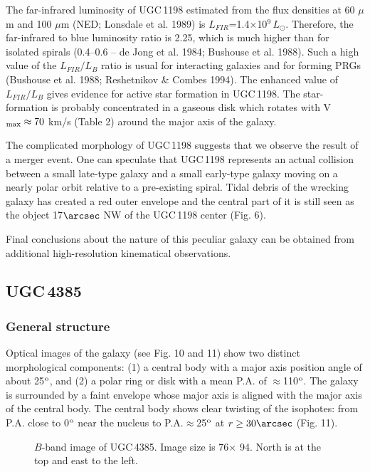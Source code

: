\documentclass[]{aa}
\begin{document}
The far-infrared luminosity of UGC\,1198 estimated from the
flux densities at 60 $\mu$m and 100 $\mu$m (NED; Lonsdale et al. 
1989) is $L_{FIR}$=1.4$\times$10$^9$\,$L_{\odot}$. Therefore,
the far-infrared to blue luminosity ratio is 2.25, which is
much higher than for isolated spirals (0.4--0.6 -- de Jong et al. 1984;
Bushouse et al. 1988). Such a high value of the $L_{FIR}/L_B$ ratio
is usual for interacting galaxies and for forming PRGs 
(Bushouse et al. 1988; Reshetnikov \& Combes 1994). The 
enhanced value of $L_{FIR}/L_B$ gives evidence for active star 
formation in UGC\,1198. The star-formation is probably concentrated
in a gaseous disk which rotates with V$_{\rm max} \approx 70$ km/s
(Table 2) around the major axis of the galaxy. 
 
The complicated morphology of UGC\,1198 suggests that we observe
the result of a merger event. One can speculate that UGC\,1198
represents an actual collision between a small late-type galaxy and 
a small early-type galaxy moving on a nearly polar orbit relative to 
a pre-existing spiral. Tidal debris of the wrecking galaxy has created
a red outer envelope and the central part of it is still seen as the
object 17$\arcsec$ NW of the UGC\,1198 center (Fig. 6).

Final conclusions about the nature of this peculiar galaxy can be
obtained from additional high-resolution kinematical observations.

\subsection{UGC\,4385}

\subsubsection{General structure}

Optical images of the galaxy (see Fig. 10 and 11) show two distinct
morphological components: (1) a central body with a major axis position
angle of about 25$^{\rm o}$, and (2) a polar ring or disk with a
mean P.A. of $\approx$110$^{\rm o}$. The galaxy is surrounded by
a faint envelope whose major axis is aligned with the major axis
of the central body. The central body shows clear twisting of the
isophotes: from P.A. close to 0$^{\rm o}$ near the nucleus to
P.A.$\approx$25$^{\rm o}$ at $r \geq 30\arcsec$ (Fig. 11).

\begin{figure}
\centerline{}
\caption{$B$-band image of UGC\,4385. Image size is 
76\arcsec $\times$ 94\arcsec.
 North is at the top and east to the left.}
\end{figure}
\end{document}

